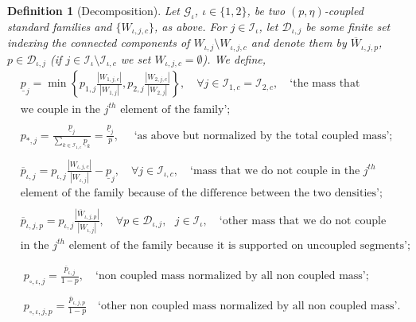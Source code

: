 \documentclass{amsart}
\numberwithin{equation}{section}
\newtheorem{definition}[theorem]{Definition}
\newcommand\cD{{\mathcal D}}
\newcommand\cG{{\mathcal G}}
\newcommand\cI{{\mathcal I}}
\begin{document}
\begin{definition}[Decomposition] \label{def:decomposition-coupled-sf}
Let \(\cG_{\iota}\), \(\iota \in \{1,2\}\), be two \((p,\eta)\)-coupled standard families and \(\{W_{\iota,j, c}\}\), as above. For \(j \in \cI_\iota\), let \(\cD_{\iota,j}\) be some finite set indexing the connected components of \(W_{\iota,j} \setminus W_{\iota,j, c}\) and denote them by \(\overline W_{\iota,j, p}\), \(p \in \cD_{\iota,j}\) (if \(j \in \cI_\iota \setminus \cI_{\iota,c}\) we set \(W_{\iota,j, c} = \emptyset\)). We define,
\[
\begin{split}
&\underline{p}_{j} = \min\left\{p_{1,j} \frac{|W_{1,j,c}|}{|W_{1,j}|}, p_{2,j} \frac{|W_{2,j,c}|}{|W_{2,j}|}\right\}, \quad \forall j \in \cI_{1,c} = \cI_{2,c},  \quad \text{`the mass that} \\
&\text{we couple in the \(j^{th}\) element of the family';}\\\\
& p_{*,j} = \frac{\underline{p}_j}{\sum_{k \in  \cI_{1,c}} \underline p_k } =  \frac{\underline{p}_j}{p}, \quad \text{ `as above but normalized by the total coupled mass';}\\\\
& \overline p_{\iota,j} = p_{\iota,j} \frac{|W_{\iota,j,c}|}{|W_{\iota,j}|} - \underline{p}_j, \quad \forall j \in \cI_{\iota,c}, \quad \text{`mass that we do not couple in the \(j^{th}\)}\\
&\text{element of the family because of the difference between the two densities';}\\\\
& \overline p_{\iota,j,p} = p_{\iota,j}\frac{|\overline W_{\iota,j,p}|}{|W_{\iota,j}|}, \quad \forall p \in  \cD_{\iota,j}, \text{ }j \in \cI_{\iota}, \quad \text{`other mass that we do not couple}\\
&\text{in the \(j^{th}\) element of the family because it is supported on uncoupled segments';}\\\\
\end{split}
\]
\[
\begin{split}
&p_{\square, \iota, j} = \frac{\overline p_{\iota,j}}{1-p}, \quad \text{`non coupled mass normalized by all non coupled mass';}\\\\
& p_{\square, \iota, j, p} = \frac{\overline p_{\iota,j,p}}{1-p}\quad \text{`other non coupled mass normalized by all non coupled mass'}.\\
&
\end{split}
\]
\end{definition}
\end{document}
